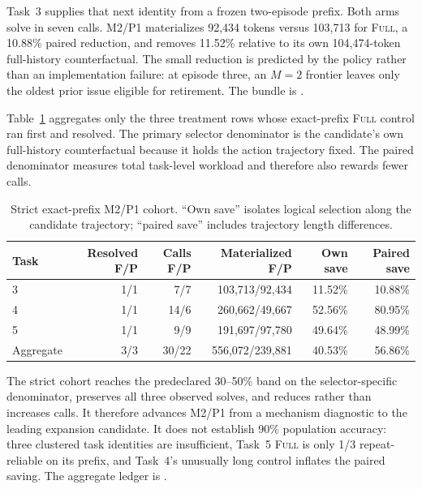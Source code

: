 \documentclass[11pt]{article}
\begin{document}
Task~3 supplies that next identity from a frozen two-episode prefix.  Both arms
solve in seven calls.  M2/P1 materializes 92,434 tokens versus 103,713 for
\textsc{Full}, a 10.88\% paired reduction, and removes 11.52\% relative to its
own 104,474-token full-history counterfactual.  The small reduction is predicted
by the policy rather than an implementation failure: at episode three, an
$M=2$ frontier leaves only the oldest prior issue eligible for retirement.
The bundle is .

Table~\ref{tab:strict-m2-p1-cohort} aggregates only the three treatment rows
whose exact-prefix \textsc{Full} control ran first and resolved.  The primary
selector denominator is the candidate's own full-history counterfactual because
it holds the action trajectory fixed.  The paired denominator measures total
task-level workload and therefore also rewards fewer calls.

\begin{table}[H]
\centering
\scriptsize
\caption{Strict exact-prefix M2/P1 cohort.  ``Own save'' isolates logical
selection along the candidate trajectory; ``paired save'' includes trajectory
length differences.}
\label{tab:strict-m2-p1-cohort}
\begin{tabular}{lrrrrr}
\toprule
Task & Resolved F/P & Calls F/P & Materialized F/P & Own save & Paired save \\
\midrule
3 & 1/1 & 7/7 & 103,713/92,434 & 11.52\% & 10.88\% \\
4 & 1/1 & 14/6 & 260,662/49,667 & 52.56\% & 80.95\% \\
5 & 1/1 & 9/9 & 191,697/97,780 & 49.64\% & 48.99\% \\
\midrule
Aggregate & 3/3 & 30/22 & 556,072/239,881 & 40.53\% & 56.86\% \\
\bottomrule
\end{tabular}
\end{table}

The strict cohort reaches the predeclared 30--50\% band on the
selector-specific denominator, preserves all three observed solves, and reduces
rather than increases calls.  It therefore advances M2/P1 from a mechanism
diagnostic to the leading expansion candidate.  It does not establish 90\%
population accuracy: three clustered task identities are insufficient, Task~5
\textsc{Full} is only 1/3 repeat-reliable on its prefix, and Task~4's unusually
long control inflates the paired saving.  The aggregate ledger is
.
\end{document}
